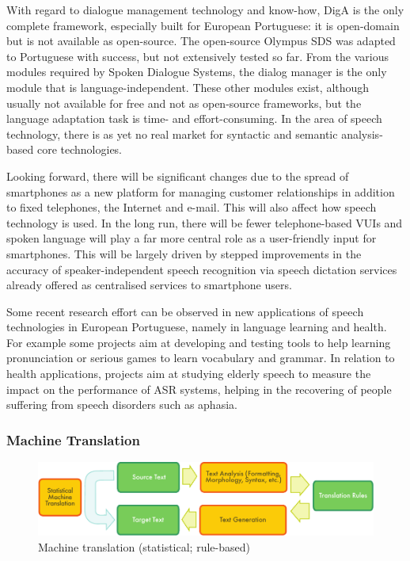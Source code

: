 \documentclass[]{../metanetpaper}
\begin{document}
\begin{multicols}{2}
    With regard to dialogue management technology and know-how, DigA is the only complete framework, especially built for European Portuguese: it is open-domain but is not available as open-source. The open-source Olympus SDS was adapted to Portuguese with success, but not extensively tested so far. From the various modules required by Spoken Dialogue Systems, the dialog manager is the only module that is language-independent. These other modules exist, although usually not available for free and not as open-source frameworks, but the language adaptation task is time- and effort-consuming. In the area of speech technology, there is as yet no real market for syntactic and semantic analysis-based core technologies.

   Looking forward, there will be significant changes due to the spread of smartphones as a new platform for managing customer relationships in addition to fixed telephones, the Internet and e-mail. This will also affect how speech technology is used. In the long run, there will be fewer telephone-based VUIs and spoken language will play a far more central role as a user-friendly input for smartphones. This will be largely driven by stepped improvements in the accuracy of speaker-independent speech recognition via speech dictation services already offered as centralised services to smartphone users. 

Some recent research effort can be observed in new applications of speech technologies in European Portuguese, namely in language learning and health. For example some projects aim at developing and testing tools to help learning pronunciation or serious games to learn vocabulary and grammar. In relation to health applications, projects aim at studying elderly speech to measure the impact on the performance of ASR systems, helping in the recovering of people suffering from speech disorders such as aphasia.

\subsubsection{Machine Translation}

\begin{figure}[htb]
  \center
  \includegraphics[width=\textwidth]{../_media/english/machine_translation}
  \caption{Machine translation (statistical; rule-based)}
  \label{fig:mtarch_en}
\end{figure}


\end{multicols}
\end{document}
